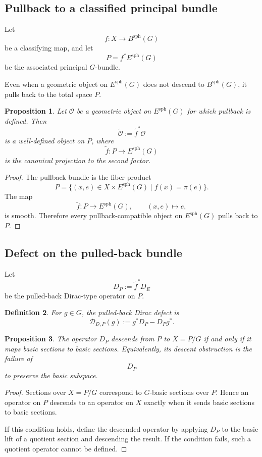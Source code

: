 \documentclass[11pt]{amsart}
\newtheorem{definition}{Definition}[section]
\newtheorem{proposition}[definition]{Proposition}
\begin{document}
\subsection{Pullback to a classified principal bundle}

Let
\[
f:X\to B^{\mathrm{sph}}(G)
\]
be a classifying map, and let
\[
P=f^*E^{\mathrm{sph}}(G)
\]
be the associated principal \(G\)-bundle.

Even when a geometric object on \(E^{\mathrm{sph}}(G)\) does not descend to
\(B^{\mathrm{sph}}(G)\), it pulls back to the total space \(P\).

\begin{proposition}
Let \(\mathcal O\) be a geometric object on \(E^{\mathrm{sph}}(G)\) for which
pullback is defined. Then
\[
\widetilde{\mathcal O}:=\tilde f^*\mathcal O
\]
is a well-defined object on \(P\), where
\[
\tilde f:P\to E^{\mathrm{sph}}(G)
\]
is the canonical projection to the second factor.
\end{proposition}

\begin{proof}
The pullback bundle is the fiber product
\[
P
=
\{(x,e)\in X\times E^{\mathrm{sph}}(G)\mid f(x)=\pi(e)\}.
\]
The map
\[
\tilde f:P\to E^{\mathrm{sph}}(G),
\qquad
(x,e)\mapsto e,
\]
is smooth. Therefore every pullback-compatible object on
\(E^{\mathrm{sph}}(G)\) pulls back to \(P\).
\end{proof}

\subsection{Defect on the pulled-back bundle}

Let
\[
D_P:=\tilde f^*D_E
\]
be the pulled-back Dirac-type operator on \(P\).

\begin{definition}
For \(g\in G\), the \emph{pulled-back Dirac defect} is
\[
\mathcal D_{D,P}(g)
:=
g^*D_P-D_Pg^*.
\]
\end{definition}

\begin{proposition}
The operator \(D_P\) descends from \(P\) to \(X=P/G\) if and only if it maps
basic sections to basic sections. Equivalently, its descent obstruction is the
failure of
\[
D_P
\]
to preserve the basic subspace.
\end{proposition}

\begin{proof}
Sections over \(X=P/G\) correspond to \(G\)-basic sections over \(P\). Hence an
operator on \(P\) descends to an operator on \(X\) exactly when it sends basic
sections to basic sections.

If this condition holds, define the descended operator by applying \(D_P\) to
the basic lift of a quotient section and descending the result. If the
condition fails, such a quotient operator cannot be defined.
\end{proof}
\end{document}
